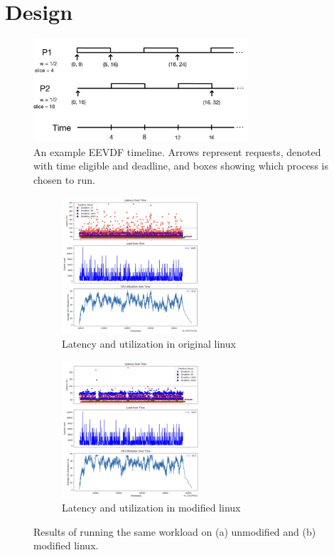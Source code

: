 \section{Design}

\begin{figure}[t!]
    \centering
    \includegraphics[height=1.5in]{img/eevdf.png}
    \caption{An example EEVDF timeline. Arrows represent requests, denoted with time eligible and deadline, 
        and boxes showing which process is chosen to run. }
    \label{eevdf}
\end{figure}

\begin{figure}[h!]
    \centering
    \begin{subfigure}[t]{0.5\textwidth}
        \centering
        \includegraphics[height=2in]{img/old_lnx__2ms_wait__10K_iter.png}
        \caption{Latency and utilization in original linux}
    \end{subfigure}%
    \hfill
    \begin{subfigure}[t]{0.5\textwidth}
        \centering
        \includegraphics[height=2in]{img/new_lnx__2ms_wait__10K_iter.png}
        \caption{Latency and utilization in modified linux}
        \label{fig:graph:new}
    \end{subfigure}
    \vspace{10pt}
    \caption{Results of running the same workload on (a) unmodified and (b) modified linux.}
    \label{fig:graph}
\end{figure}

